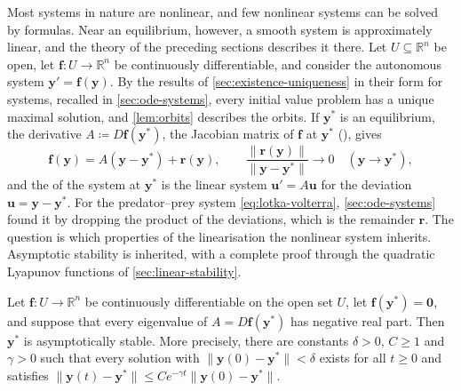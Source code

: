 Most systems in nature are nonlinear, and few nonlinear systems can be solved by formulas. Near an equilibrium, however, a smooth system is approximately linear, and the theory of the preceding sections describes it there. Let $U\subseteq\mathbb R^n$ be open, let $\mathbf f\colon U\to\mathbb R^n$ be continuously differentiable, and consider the autonomous system $\mathbf y'=\mathbf f(\mathbf y)$. By the results of \cref{sec:existence-uniqueness} in their form for systems, recalled in \cref{sec:ode-systems}, every initial value problem has a unique maximal solution, and \cref{lem:orbits} describes the orbits. If $\mathbf y^*$ is an equilibrium, the derivative $A\coloneqq D\mathbf f(\mathbf y^*)$, the Jacobian matrix of $\mathbf f$ at $\mathbf y^*$ (), gives
\[
\mathbf f(\mathbf y)=A(\mathbf y-\mathbf y^*)+\mathbf r(\mathbf y),\qquad\frac{\|\mathbf r(\mathbf y)\|}{\|\mathbf y-\mathbf y^*\|}\to0\quad(\mathbf y\to\mathbf y^*),
\]
and the  of the system at $\mathbf y^*$ is the linear system $\mathbf u'=A\mathbf u$ for the deviation $\mathbf u=\mathbf y-\mathbf y^*$. For the predator--prey system \eqref{eq:lotka-volterra}, \cref{sec:ode-systems} found it by dropping the product of the deviations, which is the remainder $\mathbf r$. The question is which properties of the linearisation the nonlinear system inherits. Asymptotic stability is inherited, with a complete proof through the quadratic Lyapunov functions of \cref{sec:linear-stability}.

\begin{theorem}
\label{thm:linearised-stability-systems}
Let $\mathbf f\colon U\to\mathbb R^n$ be continuously differentiable on the open set $U$, let $\mathbf f(\mathbf y^*)=\mathbf 0$, and suppose that every eigenvalue of $A=D\mathbf f(\mathbf y^*)$ has negative real part. Then $\mathbf y^*$ is asymptotically stable. More precisely, there are constants $\delta>0$, $C\ge1$ and $\gamma>0$ such that every solution with $\|\mathbf y(0)-\mathbf y^*\|<\delta$ exists for all $t\ge0$ and satisfies $\|\mathbf y(t)-\mathbf y^*\|\le Ce^{-\gamma t}\|\mathbf y(0)-\mathbf y^*\|$.
\end{theorem}

